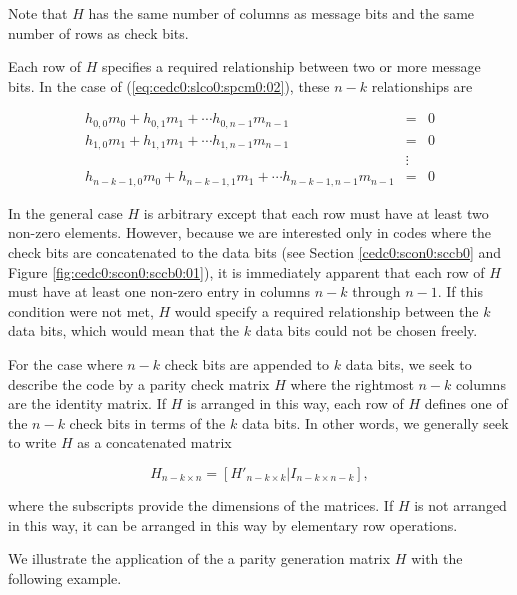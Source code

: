 Note that $H$ has the same number of columns as message bits and 
the same number of rows as check bits.

Each row of $H$ specifies a required relationship between two or more 
message bits.  In the case of (\ref{eq:cedc0:slco0:spcm0:02}), these
$n-k$ relationships are

\begin{eqnarray}
\nonumber h_{0,0} m_{0} + h_{0,1} m_{1} + \cdots{} h_{0,n-1} m_{n-1} & = & 0 \\
\label{eq:cedc0:slco0:spcm0:05}
          h_{1,0} m_{1} + h_{1,1} m_{1} + \cdots{} h_{1,n-1} m_{n-1} & = & 0 \\
\nonumber & \vdots & \\
\nonumber h_{n-k-1,0} m_{0} + h_{n-k-1,1} m_{1} + \cdots{} h_{n-k-1,n-1} m_{n-1} & = & 0
\end{eqnarray}

In the general case $H$ is arbitrary except that each row must
have at least two non-zero elements.  However, because we are
interested only in codes where the check bits are concatenated
to the data bits (see Section \ref{cedc0:scon0:sccb0} and Figure 
\ref{fig:cedc0:scon0:sccb0:01}), it is immediately
apparent that each row of $H$ must have at least one non-zero entry
in columns $n-k$ through $n-1$.  If this condition were not met, $H$ would
specify a required
relationship between the $k$ data bits, which would mean that the $k$ data bits
could not be chosen freely.

For the case where $n-k$ check bits are appended to $k$ data bits, we 
seek to describe the code by a parity check matrix $H$ where the
rightmost $n-k$ columns are the identity matrix.  If $H$ is arranged in this
way, each row of $H$ defines one of the $n-k$ check bits in terms of the $k$ data bits.
In other words, we generally seek to write $H$ as a concatenated matrix

\begin{equation}
\label{eq:cedc0:slco0:spcm0:06}
H_{n-k \times n} = [H'_{n-k \times k} | I_{n-k \times n-k} ],
\end{equation}

\noindent{}where the subscripts provide the dimensions of the matrices.
If $H$ is not arranged in this way, it can be arranged in this way by elementary
row operations.

We illustrate the application of the a parity generation matrix $H$ with the following
example.

